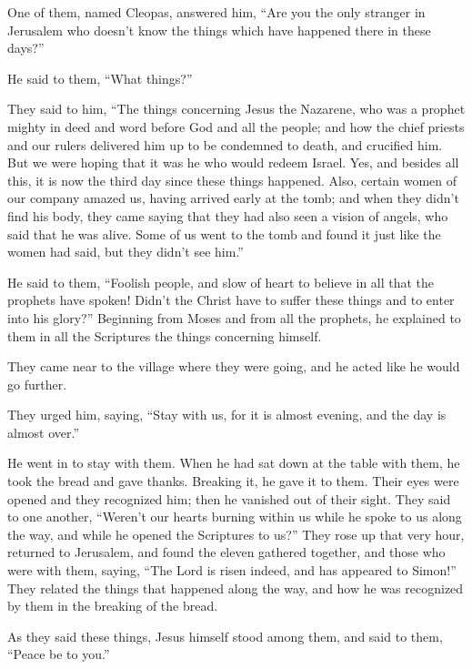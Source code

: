  One of them, named Cleopas, answered him, ``Are you the
only stranger in Jerusalem who doesn't know the things which have
happened there in these days?''

 He said to them, ``What things?''

They said to him, ``The things concerning Jesus the Nazarene, who was a
prophet mighty in deed and word before God and all the people;
 and how the chief priests and our rulers delivered him up
to be condemned to death, and crucified him.  But we were
hoping that it was he who would redeem Israel. Yes, and besides all
this, it is now the third day since these things happened. 
Also, certain women of our company amazed us, having arrived early at
the tomb;  and when they didn't find his body, they came
saying that they had also seen a vision of angels, who said that he was
alive.  Some of us went to the tomb and found it just like
the women had said, but they didn't see him.''

 He said to them, ``Foolish people, and slow of heart to
believe in all that the prophets have spoken!  Didn't the
Christ have to suffer these things and to enter into his glory?''
 Beginning from Moses and from all the prophets, he
explained to them in all the Scriptures the things concerning himself.

 They came near to the village where they were going, and
he acted like he would go further.

 They urged him, saying, ``Stay with us, for it is almost
evening, and the day is almost over.''

He went in to stay with them.  When he had sat down at the
table with them, he took the bread and gave thanks. Breaking it, he gave
it to them.  Their eyes were opened and they recognized
him; then he vanished out of their sight.  They said to one
another, ``Weren't our hearts burning within us while he spoke to us
along the way, and while he opened the Scriptures to us?'' 
They rose up that very hour, returned to Jerusalem, and found the eleven
gathered together, and those who were with them,  saying,
``The Lord is risen indeed, and has appeared to Simon!'' 
They related the things that happened along the way, and how he was
recognized by them in the breaking of the bread.

 As they said these things, Jesus himself stood among them,
and said to them, ``Peace be to you.''

